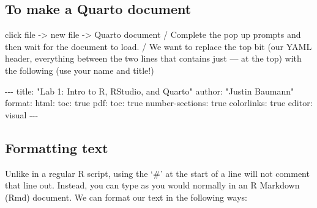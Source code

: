 \documentclass[
  letterpaper,
  DIV=11,
  numbers=noendperiod]{scrartcl}
\newenvironment{Shaded}{\begin{snugshade}}{\end{snugshade}}
\newcommand{\NormalTok}[1]{\textcolor[rgb]{0.00,0.23,0.31}{#1}}
\newcommand{\SpecialCharTok}[1]{\textcolor[rgb]{0.37,0.37,0.37}{#1}}
\newcommand{\StringTok}[1]{\textcolor[rgb]{0.13,0.47,0.30}{#1}}
\begin{document}
\hypertarget{to-make-a-quarto-document}{%
\subsection{To make a Quarto document}\label{to-make-a-quarto-document}}

click file -\textgreater{} new file -\textgreater{} Quarto document /
Complete the pop up prompts and then wait for the document to load. / We
want to replace the top bit (our YAML header, everything between the two
lines that contains just --- at the top) with the following (use your
name and title!)

\begin{Shaded}
\begin{Highlighting}[]
\SpecialCharTok{{-}{-}{-}}
\NormalTok{title}\SpecialCharTok{:} \StringTok{"Lab 1: Intro to R, RStudio, and Quarto"}
\NormalTok{author}\SpecialCharTok{:} \StringTok{"Justin Baumann"}
\NormalTok{format}\SpecialCharTok{:} 
\NormalTok{  html}\SpecialCharTok{:}
\NormalTok{    toc}\SpecialCharTok{:}\NormalTok{ true}
\NormalTok{  pdf}\SpecialCharTok{:}
\NormalTok{    toc}\SpecialCharTok{:}\NormalTok{ true}
\NormalTok{    number}\SpecialCharTok{{-}}\NormalTok{sections}\SpecialCharTok{:}\NormalTok{ true}
\NormalTok{    colorlinks}\SpecialCharTok{:}\NormalTok{ true}
\NormalTok{editor}\SpecialCharTok{:}\NormalTok{ visual}
\SpecialCharTok{{-}{-}{-}}
\end{Highlighting}
\end{Shaded}

\hypertarget{formatting-text}{%
\subsection{\texorpdfstring{\textbf{Formatting
text}}{Formatting text}}\label{formatting-text}}

Unlike in a regular R script, using the `\#' at the start of a line will
not comment that line out. Instead, you can type as you would normally
in an R Markdown (Rmd) document. We can format our text in the following
ways:
\end{document}
